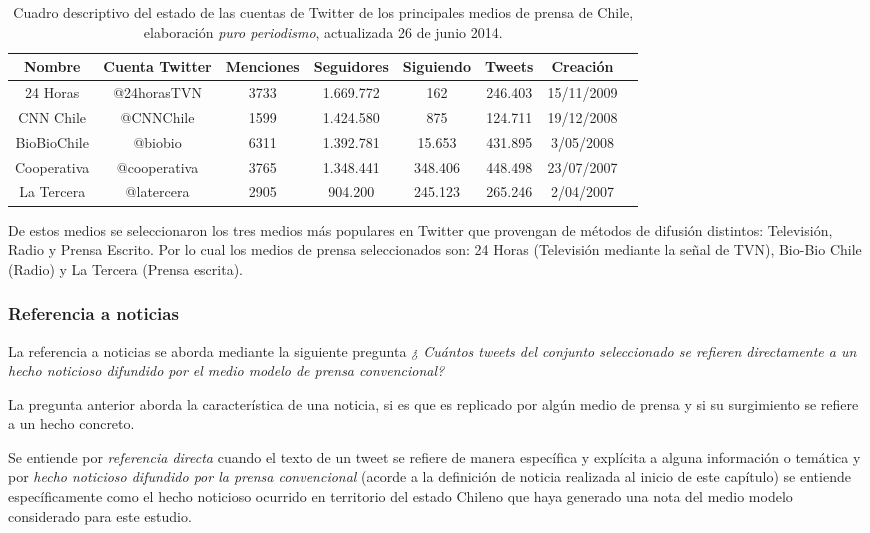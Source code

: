 
\begin{table}[h]
	\centering
	\begin{tabular}{| c | c | c | c | c | c | c | c|}
		\hline
		Nombre & Cuenta Twitter & Menciones & Seguidores & Siguiendo & Tweets & Creación \\ \hline
		24 Horas	& @24horasTVN & 3733 & 1.669.772 & 162	& 246.403	& 15/11/2009 \\ \hline
		CNN Chile	& @CNNChile	& 1599 & 1.424.580 & 875 & 124.711	&	19/12/2008	\\ \hline
		BioBioChile	& @biobio & 6311 & 1.392.781 &	15.653	& 431.895	&	3/05/2008\\ \hline
		Cooperativa	& @cooperativa & 3765 &	1.348.441 & 348.406	& 448.498 & 23/07/2007\\ \hline
		La Tercera	& @latercera & 2905 & 904.200 &	245.123 & 265.246 & 2/04/2007\\ \hline
		\hline
	\end{tabular}
	\caption {Cuadro descriptivo del estado de las cuentas de Twitter de los principales medios de prensa de Chile, elaboración \emph{puro periodismo}, actualizada 26 de junio 2014.}
\end{table}

De estos medios se seleccionaron los tres medios más populares en Twitter que provengan de métodos de difusión distintos: Televisión, Radio y Prensa Escrito. Por lo cual los medios de prensa seleccionados son: 24 Horas (Televisión mediante la señal de TVN), Bio-Bio Chile (Radio) y La Tercera (Prensa escrita). 

\subsubsection{Referencia a noticias}

La referencia a noticias se aborda mediante la siguiente pregunta \emph{¿ Cuántos tweets del conjunto seleccionado se refieren directamente a un hecho noticioso difundido por el medio modelo de prensa convencional?}

La pregunta anterior aborda la característica de una noticia, si es que es replicado por algún medio de prensa y si su surgimiento se refiere a un hecho concreto.

Se entiende por \emph{referencia directa} cuando el texto de un tweet se refiere de manera específica y explícita a alguna información o temática y por \emph{hecho noticioso difundido por la prensa convencional} (acorde a la definición de noticia realizada al inicio de este capítulo) se entiende específicamente como el hecho noticioso ocurrido en territorio del estado Chileno que haya generado una nota del medio modelo considerado para este estudio.

